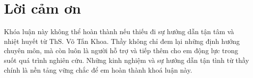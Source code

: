 \chapter*{\centering\Large{Lời cảm ơn}}





Khóa luận này không thể hoàn thành nếu thiếu đi sự hướng dẫn tận tâm và nhiệt huyết từ ThS. Võ Tấn Khoa. Thầy không chỉ đem lại những định hướng chuyên môn, mà còn luôn là người hỗ trợ và tiếp thêm cho em động lực trong suốt quá trình nghiên cứu. Những kinh nghiệm và sự hướng dẫn tận tình từ thầy chính là nền tảng  
vững chắc để em hoàn thành khoá luận này.

